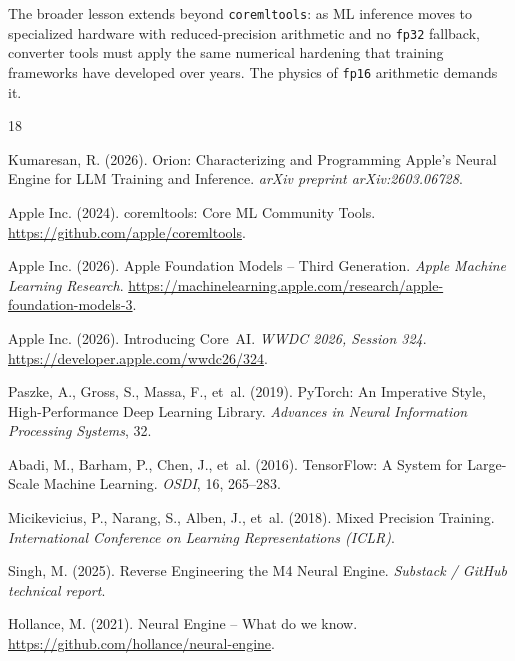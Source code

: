 \documentclass[10pt,twocolumn]{article}
\newcommand{\fp}{\texttt{fp16}}
\newcommand{\fpt}{\texttt{fp32}}
\newcommand{\coremltools}{\texttt{coremltools}}
\begin{document}
The broader lesson extends beyond \coremltools{}: as ML inference moves to
specialized hardware with reduced-precision arithmetic and no \fpt{} fallback,
converter tools must apply the same numerical hardening that training frameworks
have developed over years.  The physics of \fp{} arithmetic demands it.


\begin{thebibliography}{18}

Kumaresan, R. (2026).
\newblock Orion: Characterizing and Programming Apple's Neural Engine for LLM
  Training and Inference.
\newblock \textit{arXiv preprint arXiv:2603.06728}.

Apple Inc. (2024).
\newblock coremltools: Core ML Community Tools.
\newblock \url{https://github.com/apple/coremltools}.

Apple Inc. (2026).
\newblock Apple Foundation Models -- Third Generation.
\newblock \textit{Apple Machine Learning Research}.
\newblock \url{https://machinelearning.apple.com/research/apple-foundation-models-3}.

Apple Inc. (2026).
\newblock Introducing Core~AI.
\newblock \textit{WWDC 2026, Session 324}.
\newblock \url{https://developer.apple.com/wwdc26/324}.

Paszke, A., Gross, S., Massa, F., et~al. (2019).
\newblock PyTorch: An Imperative Style, High-Performance Deep
  Learning Library.
\newblock \textit{Advances in Neural Information Processing
  Systems}, 32.

Abadi, M., Barham, P., Chen, J., et~al. (2016).
\newblock TensorFlow: A System for Large-Scale Machine Learning.
\newblock \textit{OSDI}, 16, 265--283.

Micikevicius, P., Narang, S., Alben, J., et~al. (2018).
\newblock Mixed Precision Training.
\newblock \textit{International Conference on Learning
  Representations (ICLR)}.

Singh, M. (2025).
\newblock Reverse Engineering the M4 Neural Engine.
\newblock \textit{Substack / GitHub technical report}.

Hollance, M. (2021).
\newblock Neural Engine -- What do we know.
\newblock \url{https://github.com/hollance/neural-engine}.


\end{thebibliography}
\end{document}
